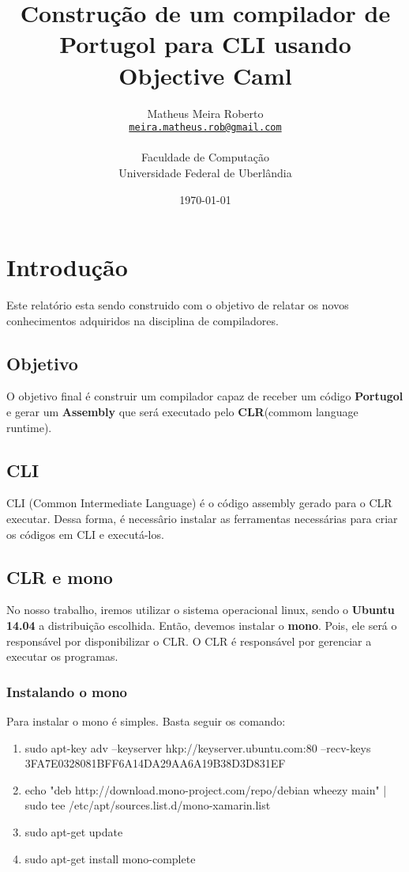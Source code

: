 \documentclass[12pt,a4paper,twoside]{report}
\title{Construção de um compilador de Portugol para CLI usando Objective Caml}
\date{}
\author{Matheus Meira Roberto \\
\texttt{\small \url{meira.matheus.rob@gmail.com}}\\
\vspace{1cm} \\
Faculdade de Computação \\
Universidade Federal de Uberlândia
}
\date{\today}
\begin{document}
  \maketitle

\tableofcontents    


\fancyhead[RE,LO]{\thesection}

\setlength{\parskip}{0.15in} %

\chapter{Introdução}
Este relatório esta sendo construido com o objetivo de relatar os novos conhecimentos adquiridos na disciplina de compiladores.

\section{Objetivo}
O objetivo final é construir um compilador capaz de receber um código \textbf{Portugol} e gerar um \textbf{Assembly} que será executado pelo \textbf{CLR}(commom language runtime).

\section{CLI}
CLI (Common Intermediate Language) é o código assembly gerado para o CLR executar. Dessa forma, é necessârio instalar as ferramentas necessárias para criar os códigos em CLI e executá-los.

\section{CLR e mono}
No nosso trabalho, iremos utilizar o sistema operacional linux, sendo o \textbf{Ubuntu 14.04} a distribuição escolhida. Então, devemos instalar o \textbf{mono}. Pois, ele será o responsável por disponibilizar o CLR. O CLR é responsável por gerenciar a executar os programas.

\subsection{Instalando o mono}
Para instalar o mono é simples. Basta seguir os comando:

\begin{enumerate}
    \item sudo apt-key adv --keyserver hkp://keyserver.ubuntu.com:80 --recv-keys 3FA7E0328081BFF6A14DA29AA6A19B38D3D831EF
    \item echo "deb http://download.mono-project.com/repo/debian wheezy main" | sudo tee /etc/apt/sources.list.d/mono-xamarin.list
    \item sudo apt-get update
    \item sudo apt-get install mono-complete
\end{enumerate}
\end{document}
